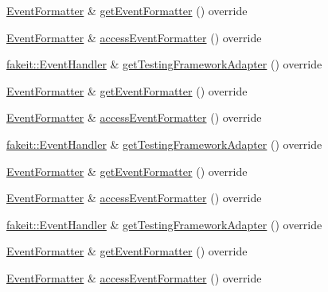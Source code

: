 \begin{DoxyCompactItemize}
\item 
\mbox{\hyperlink{structfakeit_1_1EventFormatter}{Event\+Formatter}} \& \mbox{\hyperlink{classfakeit_1_1DefaultFakeit_ae06b5536bcde628ed7e32499eb8b9ac3}{get\+Event\+Formatter}} () override
\item 
\mbox{\hyperlink{structfakeit_1_1EventFormatter}{Event\+Formatter}} \& \mbox{\hyperlink{classfakeit_1_1DefaultFakeit_a02cb8f08a94e7bf830c87f74f20c9bd9}{access\+Event\+Formatter}} () override
\item 
\mbox{\hyperlink{structfakeit_1_1EventHandler}{fakeit\+::\+Event\+Handler}} \& \mbox{\hyperlink{classfakeit_1_1DefaultFakeit_af01d86eee74123b4794c07aac3767ad7}{get\+Testing\+Framework\+Adapter}} () override
\item 
\mbox{\hyperlink{structfakeit_1_1EventFormatter}{Event\+Formatter}} \& \mbox{\hyperlink{classfakeit_1_1DefaultFakeit_ae06b5536bcde628ed7e32499eb8b9ac3}{get\+Event\+Formatter}} () override
\item 
\mbox{\hyperlink{structfakeit_1_1EventFormatter}{Event\+Formatter}} \& \mbox{\hyperlink{classfakeit_1_1DefaultFakeit_a02cb8f08a94e7bf830c87f74f20c9bd9}{access\+Event\+Formatter}} () override
\item 
\mbox{\hyperlink{structfakeit_1_1EventHandler}{fakeit\+::\+Event\+Handler}} \& \mbox{\hyperlink{classfakeit_1_1DefaultFakeit_af01d86eee74123b4794c07aac3767ad7}{get\+Testing\+Framework\+Adapter}} () override
\item 
\mbox{\hyperlink{structfakeit_1_1EventFormatter}{Event\+Formatter}} \& \mbox{\hyperlink{classfakeit_1_1DefaultFakeit_ae06b5536bcde628ed7e32499eb8b9ac3}{get\+Event\+Formatter}} () override
\item 
\mbox{\hyperlink{structfakeit_1_1EventFormatter}{Event\+Formatter}} \& \mbox{\hyperlink{classfakeit_1_1DefaultFakeit_a02cb8f08a94e7bf830c87f74f20c9bd9}{access\+Event\+Formatter}} () override
\item 
\mbox{\hyperlink{structfakeit_1_1EventHandler}{fakeit\+::\+Event\+Handler}} \& \mbox{\hyperlink{classfakeit_1_1DefaultFakeit_af01d86eee74123b4794c07aac3767ad7}{get\+Testing\+Framework\+Adapter}} () override
\item 
\mbox{\hyperlink{structfakeit_1_1EventFormatter}{Event\+Formatter}} \& \mbox{\hyperlink{classfakeit_1_1DefaultFakeit_ae06b5536bcde628ed7e32499eb8b9ac3}{get\+Event\+Formatter}} () override
\item 
\mbox{\hyperlink{structfakeit_1_1EventFormatter}{Event\+Formatter}} \& \mbox{\hyperlink{classfakeit_1_1DefaultFakeit_a02cb8f08a94e7bf830c87f74f20c9bd9}{access\+Event\+Formatter}} () override

\end{DoxyCompactItemize}
